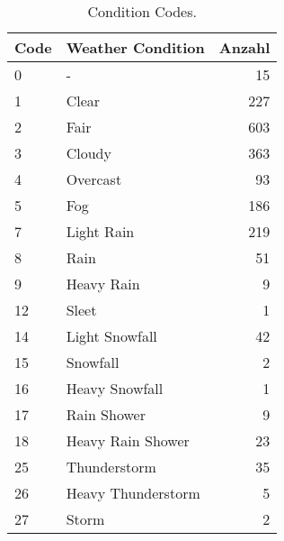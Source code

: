 \begin{table}[t]
    \caption{Condition Codes.}
    \label{tab:coco}
    \centering
    \small
    \begin{tabular}{l l r}
        \toprule
        Code & Weather Condition\cite{coco:2021} & Anzahl\\
        \midrule
        0 & - & 15\\
        1 & Clear & 227\\
        2 & Fair & 603\\
        3 & Cloudy & 363\\
        4 & Overcast & 93\\
        5 & Fog & 186\\
        7 & Light Rain & 219\\
        8 & Rain & 51\\
        9 & Heavy Rain & 9\\
        12 & Sleet & 1\\
        14 & Light Snowfall & 42\\
        15 & Snowfall & 2\\
        16 & Heavy Snowfall & 1\\
        17 & Rain Shower & 9\\
        18 & Heavy Rain Shower & 23\\
        25 & Thunderstorm & 35\\
        26 & Heavy Thunderstorm & 5\\
        27 & Storm & 2\\
        \bottomrule
    \end{tabular}
\end{table}